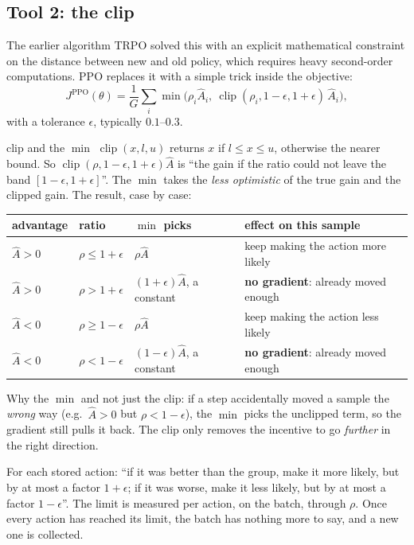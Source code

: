 \documentclass[11pt,a4paper]{article}
\newcommand{\clip}{\operatorname{clip}}
\newcommand{\Ah}{\hat A}
\begin{document}
\subsection{Tool 2: the clip}
The earlier algorithm TRPO solved this with an explicit mathematical constraint on the distance between new and old policy, which requires heavy second-order computations. PPO replaces it with a simple trick inside the objective:
\begin{equation}
J^{\mathrm{PPO}}(\theta)=\frac1G\sum_i\min\Big(\rho_i\Ah_i,\ \clip(\rho_i,1-\epsilon,1+\epsilon)\,\Ah_i\Big),
\label{eq:ppo}
\end{equation}
with a tolerance $\epsilon$, typically $0.1$--$0.3$.
\begin{newc}{clip and the $\min$}
$\clip(x,l,u)$ returns $x$ if $l\le x\le u$, otherwise the nearer bound. So $\clip(\rho,1-\epsilon,1+\epsilon)\Ah$ is ``the gain if the ratio could not leave the band $[1-\epsilon,1+\epsilon]$''. The $\min$ takes the \emph{less optimistic} of the true gain and the clipped gain. The result, case by case:
\begin{center}
\small
\begin{tabular}{@{}llll@{}}
\toprule
advantage & ratio & $\min$ picks & effect on this sample\\
\midrule
$\Ah>0$ & $\rho\le1+\epsilon$ & $\rho\Ah$ & keep making the action more likely\\
$\Ah>0$ & $\rho>1+\epsilon$ & $(1+\epsilon)\Ah$, a constant & \textbf{no gradient}: already moved enough\\
$\Ah<0$ & $\rho\ge1-\epsilon$ & $\rho\Ah$ & keep making the action less likely\\
$\Ah<0$ & $\rho<1-\epsilon$ & $(1-\epsilon)\Ah$, a constant & \textbf{no gradient}: already moved enough\\
\bottomrule
\end{tabular}
\end{center}
Why the $\min$ and not just the clip: if a step accidentally moved a sample the \emph{wrong} way (e.g.\ $\Ah>0$ but $\rho<1-\epsilon$), the $\min$ picks the unclipped term, so the gradient still pulls it back. The clip only removes the incentive to go \emph{further} in the right direction.
\end{newc}

\begin{intuition}
For each stored action: ``if it was better than the group, make it more likely, but by at most a factor $1+\epsilon$; if it was worse, make it less likely, but by at most a factor $1-\epsilon$''. The limit is measured per action, on the batch, through $\rho$. Once every action has reached its limit, the batch has nothing more to say, and a new one is collected.
\end{intuition}
\end{document}
